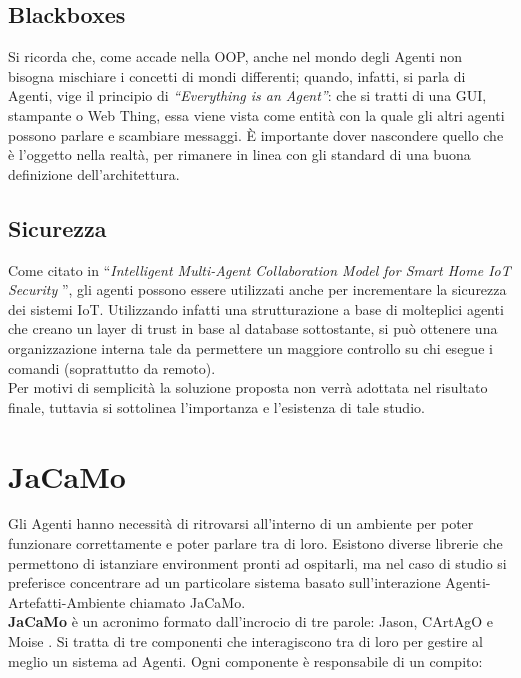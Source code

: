 \documentclass[12pt,a4paper,openright,oneside]{report}
\newcommand{\quotes}[1]{``#1''}
\begin{document}
\subsection{Blackboxes}
Si ricorda che, come accade nella OOP, anche nel mondo degli Agenti non bisogna mischiare i concetti di mondi differenti; quando, infatti, si parla di Agenti, vige il principio di \textit{\quotes{Everything is an Agent}}: che si tratti di una GUI, stampante o Web Thing, essa viene vista come entità con la quale gli altri agenti possono parlare e scambiare messaggi. È importante dover nascondere quello che è l'oggetto nella realtà, per rimanere in linea con gli standard di una buona definizione dell'architettura.\\

\subsection{Sicurezza}
Come citato in \quotes{\textit{Intelligent Multi-Agent Collaboration Model for Smart Home IoT Security} \cite{security}}, gli agenti possono essere utilizzati anche per incrementare la sicurezza dei sistemi IoT. Utilizzando infatti una strutturazione a base di molteplici agenti che creano un layer di trust in base al database sottostante, si può ottenere una organizzazione interna tale da permettere un maggiore controllo su chi esegue i comandi (soprattutto da remoto).\\

Per motivi di semplicità la soluzione proposta non verrà adottata nel risultato finale, tuttavia si sottolinea l'importanza e l'esistenza di tale studio.


\section{JaCaMo}
Gli Agenti hanno necessità di ritrovarsi all'interno di un ambiente per poter funzionare correttamente e poter parlare tra di loro. Esistono diverse librerie che permettono di istanziare environment pronti ad ospitarli, ma nel caso di studio si preferisce concentrare ad un particolare sistema basato sull'interazione Agenti-Artefatti-Ambiente chiamato JaCaMo.\\

\textbf{JaCaMo} \cite{jacamo} è un acronimo formato dall'incrocio di tre parole: Jason, CArtAgO \cite{cartago} e Moise \cite{moise}. Si tratta di tre componenti che interagiscono tra di loro per gestire al meglio un sistema ad Agenti. Ogni componente è responsabile di un compito:
\end{document}
